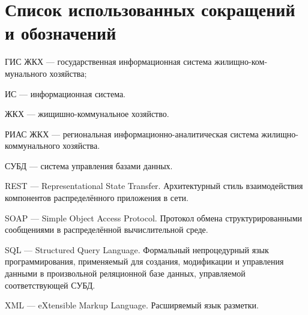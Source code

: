 \section*{Список использованных сокращений и обозначений}

ГИС ЖКХ --- государственная информационная система жилищно-ком-\linebreak мунального хозяйства;

ИС --- информационная система.

ЖКХ --- жищишно-коммунальное хозяйство.

РИАС ЖКХ --- региональная информационно-аналитическая система жилищно-коммунального хозяйства.

СУБД --- система управления базами данных.

REST --- Representational State Transfer. Архитектурный стиль взаимодействия компонентов распределённого приложения в сети.

SOAP --- Simple Object Access Protocol. Протокол обмена структурированными сообщениями в распределённой вычислительной среде.

SQL --- Structured Query Language. Формальный непроцедурный язык программирования, применяемый для создания, модификации и управления данными в произвольной реляционной базе данных, управляемой соответствующей СУБД.

XML --- eXtensible Markup Language. Расширяемый язык разметки.

\clearpage
\newpage